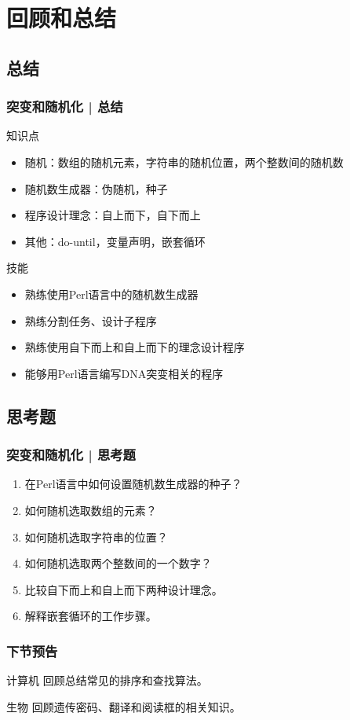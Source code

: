 \section{回顾和总结}
\subsection{总结}
\begin{frame}
  \frametitle{突变和随机化 | 总结}
  \begin{block}{知识点}
    \begin{itemize}
      \item 随机：数组的随机元素，字符串的随机位置，两个整数间的随机数
      \item 随机数生成器：伪随机，种子
      \item 程序设计理念：自上而下，自下而上
      \item 其他：do-until，变量声明，嵌套循环
    \end{itemize}
  \end{block}
  \pause
  \begin{block}{技能}
    \begin{itemize}
      \item 熟练使用Perl语言中的随机数生成器
      \item 熟练分割任务、设计子程序
      \item 熟练使用自下而上和自上而下的理念设计程序
      \item 能够用Perl语言编写DNA突变相关的程序
    \end{itemize}
  \end{block}
\end{frame}

\subsection{思考题}
\begin{frame}
  \frametitle{突变和随机化 | 思考题}
  \begin{enumerate}
    \item 在Perl语言中如何设置随机数生成器的种子？
    \item 如何随机选取数组的元素？
    \item 如何随机选取字符串的位置？
    \item 如何随机选取两个整数间的一个数字？
    \item 比较自下而上和自上而下两种设计理念。
    \item 解释嵌套循环的工作步骤。
  \end{enumerate}
\end{frame}

\begin{frame}
  \frametitle{下节预告}
  \begin{block}{计算机}
    回顾总结常见的排序和查找算法。
  \end{block}
  \begin{block}{生物}
    回顾遗传密码、翻译和阅读框的相关知识。
  \end{block}
\end{frame}



